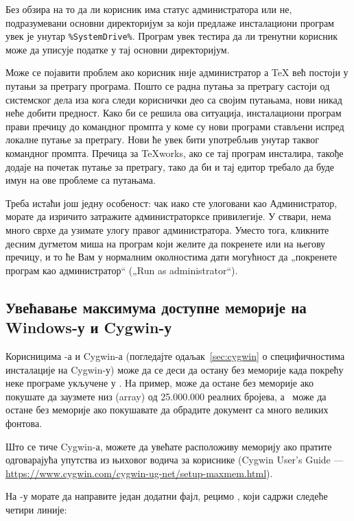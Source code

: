 \documentclass{article}
\begin{document}
Без обзира на то да ли корисник има статус администратора или не,
подразумевани основни директоријум за \TL{} који предлаже инсталациони
програм увек је унутар \verb|%SystemDrive%|. Програм увек тестира да
ли тренутни корисник може да уписује податке у тај основни директоријум.

Може се појавити проблем ако корисник није администратор а \TeX{} већ
постоји у путањи за претрагу програма. Пошто се радна путања за
претрагу састоји од системског дела иза кога следи кориснички део са
својим путањама, нови \TL{} никад неће добити предност. Како би се
решила ова ситуација, инсталациони програм прави пречицу до командног
промпта у коме су нови \TL{} програми стављени испред локалне путање
за претрагу. Нови \TL{} ће увек бити употребљив унутар таквог
командног промпта. Пречица за \TeX{}works, ако се тај програм
инсталира, такође додаје \TL{} на почетак путање за претрагу, тако да
би и тај едитор требало да буде имун на ове проблеме са путањама.

Треба истаћи још једну особеност: чак иако сте улоговани као 
Администратор, морате да изричито затражите администраторксе привилегије. 
У ствари, нема много сврхе да узимате улогу правог администратора. 
Уместо тога, кликните десним дугметом миша на програм који желите да 
покренете или на његову пречицу, и то ће Вам у нормалним околностима 
дати могућност да „покренете програм као администратор“ 
(„\textenglish{Run as administrator}“).


\subsection{Увећавање максимума доступне меморије на Windows-у и
  Cygwin-у}
\label{sec:cygwin-maxmem}

Корисницима \Windows{}-а и Cygwin-а (погледајте
одаљак~\ref{sec:cygwin} о специфичностима инсталације на Cygwin-у)
може да се деси да остану без меморије када покрећу неке програме
укључене у \TL. На пример,  може да остане без меморије ако
покушате да заузмете низ (array) од 25.000.000 реалних бројева, а
\LuaTeX\ може да остане без меморије ако покушавате да обрадите
документ са много великих фонтова.

Што се тиче Cygwin-а, можете да увећате расположиву меморију ако
пратите одговарајућа упутства из њиховог водича за кориснике (Cygwin
User's Guide ---
\url{https://www.cygwin.com/cygwin-ug-net/setup-maxmem.html}).

На \Windows{}-у морате да направите један додатни фајл, рецимо
, који садржи следеће четири линије:
\end{document}
